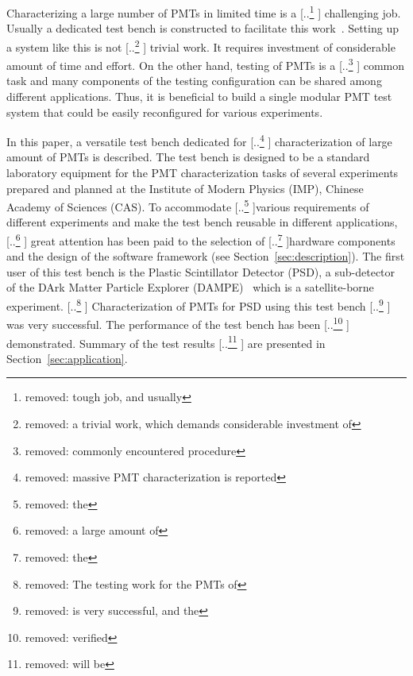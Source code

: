 \documentclass{nst}
\providecommand{\DIFadd}[1]{{\protect\color{blue} \sf #1}} %
\providecommand{\DIFdel}[1]{{\protect\color{red} [..\footnote{removed: #1} ]}} %
\providecommand{\DIFaddbegin}{} %
\providecommand{\DIFaddend}{} %
\providecommand{\DIFdelbegin}{} %
\providecommand{\DIFdelend}{} %
\begin{document}
Characterizing a large number of PMTs in limited time is a \DIFdelbegin \DIFdel{tough job, and usually }\DIFdelend \DIFaddbegin \DIFadd{challenging job. Usually }\DIFaddend a dedicated test bench is constructed to facilitate this work~\cite{barnhill_testing_2008,akgun_complete_2005,adragna_pmt-block_2006}.
Setting up a system like this is not \DIFdelbegin \DIFdel{a trivial work, which demands considerable investment of }\DIFdelend \DIFaddbegin \DIFadd{trivial work. It requires investment of considerable amount of }\DIFaddend time and effort.
On the other hand, testing of PMTs is a \DIFdelbegin \DIFdel{commonly encountered procedure }\DIFdelend \DIFaddbegin \DIFadd{common task }\DIFaddend and many components of the testing configuration can be shared among different applications.
\DIFaddbegin \DIFadd{Thus, it is beneficial to build a single modular PMT test system that could be easily reconfigured for various experiments.
}\DIFaddend 

In this paper, a versatile test bench dedicated for \DIFdelbegin \DIFdel{massive PMT characterization is reported}\DIFdelend \DIFaddbegin \DIFadd{characterization of large amount of PMTs is described}\DIFaddend .
The test bench is designed to be a standard laboratory equipment for the PMT characterization tasks of several experiments prepared and planned at the Institute of Modern Physics (IMP), Chinese Academy of Sciences (CAS).
To accommodate \DIFdelbegin \DIFdel{the }\DIFdelend various requirements of different experiments and make the test bench reusable in different applications, \DIFdelbegin \DIFdel{a large amount of }\DIFdelend \DIFaddbegin \DIFadd{great }\DIFaddend attention has been paid to the selection of  \DIFdelbegin \DIFdel{the }\DIFdelend hardware components and the design of the software framework (see Section~\ref{sec:description}).
The first user of this test bench is the Plastic Scintillator Detector (PSD), a sub-detector of the DArk Matter Particle Explorer (DAMPE)~\cite{Chang_Jin_dampe} which is a satellite-borne experiment. 
\DIFdelbegin \DIFdel{The testing work for the PMTs of }\DIFdelend \DIFaddbegin \DIFadd{Characterization of PMTs for }\DIFaddend PSD using this test bench \DIFdelbegin \DIFdel{is very successful, and the }\DIFdelend \DIFaddbegin \DIFadd{was very successful. The }\DIFaddend performance of the test bench has been \DIFdelbegin \DIFdel{verified}\DIFdelend \DIFaddbegin \DIFadd{demonstrated}\DIFaddend .
Summary of the test results \DIFdelbegin \DIFdel{will be }\DIFdelend \DIFaddbegin \DIFadd{are }\DIFaddend presented in Section~\ref{sec:application}.
\end{document}
